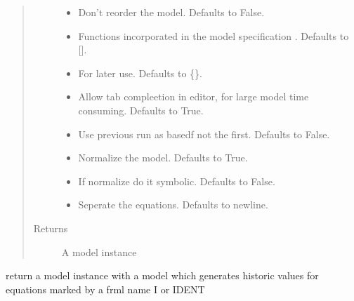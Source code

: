 \documentclass[letterpaper,10pt,english]{sphinxmanual}
\begin{document}
\begin{fulllineitems}
\begin{fulllineitems}
\begin{quote}
\begin{description}
\begin{itemize}
\item {} 
\sphinxAtStartPar
{} \textendash{} Don’t reorder the model. Defaults to False.

\item {} 
\sphinxAtStartPar
{} \textendash{} Functions incorporated in the model specification . Defaults to {[}{]}.

\item {} 
\sphinxAtStartPar
{} \textendash{} For later use. Defaults to \{\}.

\item {} 
\sphinxAtStartPar
{} \textendash{} Allow tab compleetion in editor, for large model time consuming. Defaults to True.

\item {} 
\sphinxAtStartPar
{} \textendash{} Use previous run as basedf not the first. Defaults to False.

\item {} 
\sphinxAtStartPar
{} \textendash{} Normalize the model. Defaults to True.

\item {} 
\sphinxAtStartPar
{} \textendash{} If normalize do it symbolic. Defaults to False.

\item {} 
\sphinxAtStartPar
{} \textendash{} Seperate the equations. Defaults to newline.

\end{itemize}

\item[{Returns}] \leavevmode
\sphinxAtStartPar
A model instance

\end{description}\end{quote}

\end{fulllineitems}


\begin{fulllineitems}
\label{\detokenize{core/modelclass:modelclass.BaseModel.get_histmodel}}
\pysigstartsignatures
{}
\pysigstopsignatures
\sphinxAtStartPar
return a model instance with a model which generates historic values for equations
marked by a frml name I or IDENT


\end{fulllineitems}
\end{fulllineitems}
\end{document}
